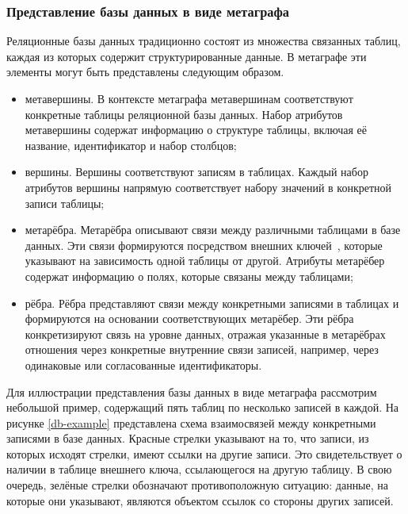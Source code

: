 \subsubsection{Представление базы данных в виде метаграфа}

Реляционные базы данных традиционно состоят из множества связанных таблиц, каждая из которых содержит структурированные данные. В метаграфе эти элементы могут быть представлены следующим образом.

\begin{itemize}
  \item метавершины. В контексте метаграфа метавершинам соответствуют конкретные таблицы реляционной базы данных. Набор атрибутов метавершины содержат информацию о структуре таблицы, включая её название, идентификатор и набор столбцов;

  \item вершины. Вершины соответствуют записям в таблицах. Каждый набор атрибутов вершины напрямую соответствует набору значений в конкретной записи таблицы;

  \item метарёбра. Метарёбра описывают связи между различными таблицами в базе данных. Эти связи формируются посредством внешних ключей~\cite{foreign-key}, которые указывают на зависимость одной таблицы от другой. Атрибуты метарёбер содержат информацию о полях, которые связаны между таблицами;

  \item рёбра. Рёбра представляют связи между конкретными записями в таблицах и формируются на основании соответствующих метарёбер. Эти рёбра конкретизируют связь на уровне данных, отражая указанные в метарёбрах отношения через конкретные внутренние связи записей, например, через одинаковые или согласованные идентификаторы.
\end{itemize}

Для иллюстрации представления базы данных в виде метаграфа рассмотрим небольшой пример, содержащий пять таблиц по несколько записей в каждой. На рисунке \ref{db-example} представлена схема взаимосвязей между конкретными записями в базе данных. Красные стрелки указывают на то, что записи, из которых исходят стрелки, имеют ссылки на другие записи. Это свидетельствует о наличии в таблице внешнего ключа, ссылающегося на другую таблицу. В свою очередь, зелёные стрелки обозначают противоположную ситуацию: данные, на которые они указывают, являются объектом ссылок со стороны других записей.

